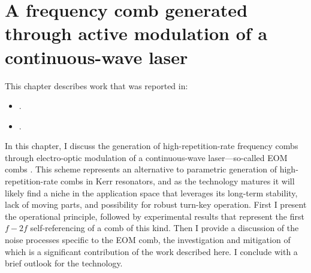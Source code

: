  \chapter{A frequency comb generated through active modulation of a continuous-wave laser}\label{chap:EOMCombs}
   \begin{footnotesize}
 	\begin{spacing}{1.2}
 		This chapter describes work that was reported in:
 		\begin{itemize}
 			\item {}.\\
 			\item {}.\\
 		\end{itemize}
 	\end{spacing}
 \end{footnotesize}

In this chapter, I discuss the generation of high-repetition-rate frequency combs through electro-optic modulation of a continuous-wave laser---so-called EOM combs \cite{Kobayashi1972,Kourogi1993,Murata2000,Sakamoto2007,Morohashi2008,Ishizawa2010,Wu2010,Supradeepa2012,Metcalf2013,Wu2013}. This scheme represents an alternative to parametric generation of high-repetition-rate combs in Kerr resonators, and as the technology matures it will likely find a niche in the application space that leverages its long-term stability, lack of moving parts, and possibility for robust turn-key operation. First I present the operational principle, followed by experimental results that represent the first $f-2f$ self-referencing of a comb of this kind. Then I provide a discussion of the noise processes specific to the EOM comb, the investigation and mitigation of which is a significant contribution of the work described here. I conclude with a brief outlook for the technology.

